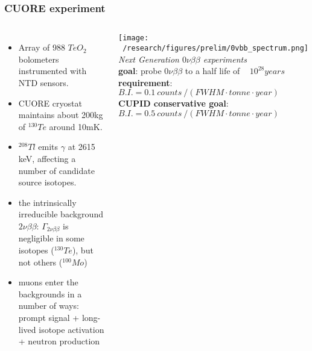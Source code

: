 \documentclass{beamer}
\begin{document}
	\begin{frame}
		\frametitle{CUORE experiment}
		\begin{columns}[c] %
			
			\begin{itemize}
			\item Array of 988 $TeO_2$ bolometers instrumented with NTD sensors.
			\item CUORE	cryostat maintains about 200kg of $^{130}Te$ around 10mK.
			\item $^{208}Tl$ emits $\gamma$ at 2615 keV, affecting a number of candidate source isotopes.
			\item the intrinsically irreducible background $2\nu\beta\beta$: $\Gamma_{2\nu\beta\beta}$ is negligible in some isotopes ($^{130}Te$), but not others ($^{100}Mo$)
			\item muons enter the backgrounds in a number of ways: prompt signal + long-lived isotope activation + neutron production
			\end{itemize}			 
			
		
			\texttt{[image: ~/research/figures/prelim/0vbb\_spectrum.png]}
			{\footnotesize \textit{Next Generation $0\nu\beta\beta$ experiments} \\
			\textbf{goal}: probe $0\nu\beta\beta$ to a half life of ~ $10^{28} years$ \\
			\textbf{requirement}: $B.I. = 0.1 \ counts\ / \left( FWHM\cdot tonne \cdot year \right)$ \\
			\textbf{CUPID conservative goal}: $B.I. = 0.5 \ counts\ / \left( FWHM\cdot tonne \cdot year \right)$}
			
		\end{columns}
	\end{frame}
	
\end{document}
